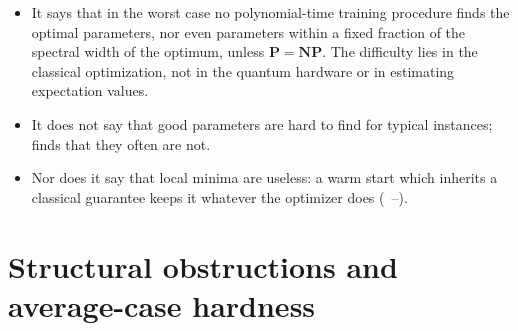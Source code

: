 \documentclass[handoutsbeamer.tex]{subfiles}
\begin{document}
\begin{frame}
\begin{itemize}\setlength\itemsep{0.3em}
    \item It says that in the worst case no polynomial-time training procedure finds the optimal parameters, nor even parameters within a fixed fraction of the spectral width of the optimum, unless $\mathbf P = \mathbf{NP}$. The difficulty lies in the classical optimization, not in the quantum hardware or in estimating expectation values.
    \item It does not say that good parameters are hard to find for typical instances; \Chap~ finds that they often are not.
    \item Nor does it say that local minima are useless: a warm start which inherits a classical guarantee keeps it whatever the optimizer does (\Chaps~--).
\end{itemize}
\end{frame}

\section{Structural obstructions and average-case hardness}
\end{document}
